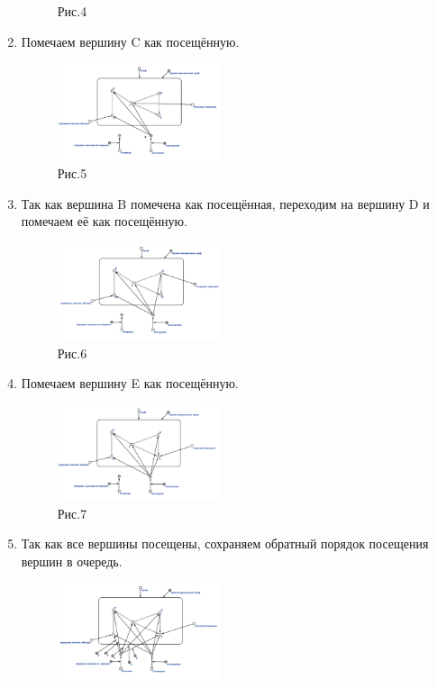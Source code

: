 \documentclass[10pt,a4paper,twocolumn]{article}
\begin{document}
\begin{enumerate}
\begin{figure}[h]
		\caption{Рис.4}
	\end{figure}
    \newpage
	\item Помечаем вершину C как посещённую.
	\begin{figure}[h]
		\includegraphics[width=0.45\textwidth]{img/5.png}
		\caption{Рис.5}
	\end{figure}
	\item Так как вершина B помечена как посещённая, переходим на вершину D и помечаем её как посещённую.
	\begin{figure}[h]
		\includegraphics[width=0.45\textwidth]{img/6.png}
		\caption{Рис.6}
	\end{figure}
	\item Помечаем вершину E как посещённую.
	\begin{figure}[h]
		\includegraphics[width=0.45\textwidth]{img/7.png}
		\caption{Рис.7}
	\end{figure}
    \newpage
	\item Так как все вершины посещены, сохраняем обратный порядок посещения вершин в очередь.
    \begin{figure}[h]
		\includegraphics[width=0.45\textwidth]{img/8.png}

\end{figure}
\end{enumerate}
\end{document}
